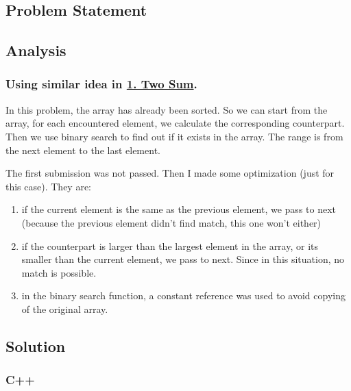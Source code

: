 \documentclass[12pt]{article}
\begin{document}
\subsection{Problem Statement}
\label{sec:org1e5d302}
\subsection{Analysis}
\label{sec:org69e23a9}
\subsubsection{Using similar idea in \hyperref[org0d0e7a1]{1. Two Sum}.}
\label{sec:orgd3d0e2e}
In this problem, the array has already been sorted. So we can start from the array, for each encountered element, we calculate the corresponding counterpart. Then we use binary search to find out if it exists in the array. The range is from the next element to the last element.

The first submission was not passed. Then I made some optimization (just for this case). They are:
\begin{enumerate}
\item if the current element is the same as the previous element, we pass to next (because the previous element didn't find match, this one won't either)
\item if the counterpart is larger than the largest element in the array, or its smaller than the current element, we pass to next. Since in this situation, no match is possible.
\item in the binary search function, a constant reference was used to avoid copying of the original array.
\end{enumerate}
\subsection{Solution}
\label{sec:org55dadfd}
\subsubsection{C++}
\label{sec:org6429d75}
\end{document}
